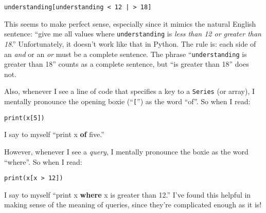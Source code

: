 \begin{Verbatim}[fontsize=\small,samepage=true,frame=single,framesep=3mm]
understanding[understanding < 12 | > 18]
\end{Verbatim}

This seems to make perfect sense, especially since it mimics the natural
English sentence: ``give me all values where \texttt{understanding} is
\textit{less than 12 or greater than 18}.'' Unfortunately, it doesn't work like
that in Python. The rule is: each side of an \textsl{and} or an \textsl{or}
must be a complete sentence. The phrase ``\texttt{understanding} is greater
than 18'' counts as a complete sentence, but ``is greater than 18'' does not.


Also, whenever I see a line of code that specifies a key to a \texttt{Series}
(or array), I mentally pronounce the opening boxie (``\texttt{[}'') as the word
``of''. So when I read:

\begin{Verbatim}[fontsize=\small,samepage=true,frame=single,framesep=3mm]
print(x[5])
\end{Verbatim}
\vspace{-.2in}

I say to myself ``print x \textbf{of} five.''

However, whenever I see a \textit{query}, I mentally pronounce the 
boxie as the word ``where''. So when I read:

\begin{Verbatim}[fontsize=\small,samepage=true,frame=single,framesep=3mm]
print(x[x > 12])
\end{Verbatim}
\vspace{-.2in}

I say to myself ``print x \textbf{where} x is greater than 12.'' I've found
this helpful in making sense of the meaning of queries, since they're
complicated enough as it is!
